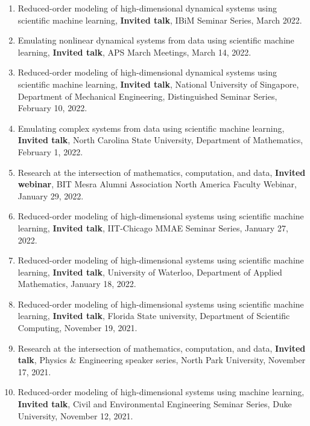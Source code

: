 \documentclass[letterpaper]{article}
\begin{document}
\begin{enumerate}
\item Reduced-order modeling of high-dimensional dynamical systems using scientific machine learning, \textbf{Invited talk}, IBiM Seminar Series, March 2022.

\item Emulating nonlinear dynamical systems from data using scientific machine learning, \textbf{Invited talk}, APS March Meetings, March 14, 2022.

\item Reduced-order modeling of high-dimensional dynamical systems using scientific machine learning, \textbf{Invited talk}, National University of Singapore, Department of Mechanical Engineering, Distinguished Seminar Series, February 10, 2022.

\item Emulating complex systems from data using scientific machine learning, \textbf{Invited talk}, North Carolina State University, Department of Mathematics, February 1, 2022.

\item Research at the intersection of mathematics, computation, and data, \textbf{Invited webinar}, BIT Mesra Alumni Association North America Faculty Webinar, January 29, 2022.

\item Reduced-order modeling of high-dimensional systems using scientific machine learning, \textbf{Invited talk}, IIT-Chicago MMAE Seminar Series, January 27, 2022.

\item Reduced-order modeling of high-dimensional systems using scientific machine learning, \textbf{Invited talk}, University of Waterloo, Department of Applied Mathematics, January 18, 2022.

\item Reduced-order modeling of high-dimensional systems using scientific machine learning, \textbf{Invited talk}, Florida State university, Department of Scientific Computing, November 19, 2021.

\item Research at the intersection of mathematics, computation, and data, \textbf{Invited talk}, Physics \& Engineering speaker series, North Park University, November 17, 2021.

\item Reduced-order modeling of high-dimensional systems using machine learning, \textbf{Invited talk}, Civil and Environmental Engineering Seminar Series, Duke University, November 12, 2021.


\end{enumerate}
\end{document}
